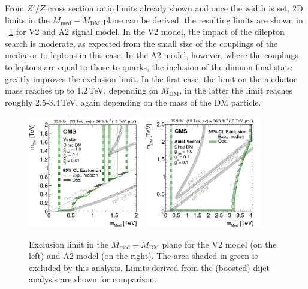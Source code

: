 From $Z'/Z$ cross section ratio limits already shown and once the width is set, 2D limits in the $M_{\mathrm{med}}-M_{\mathrm{DM}}$ plane can be derived: the resulting limits are shown in \figurename~\ref{fig:DMLimitV2} for V2 and A2 signal model. In the V2 model, the impact of the dilepton search is moderate, as expected from the small size of the couplings of the mediator to leptons in this case. In the A2 model, however, where the couplings to leptons are equal to those to quarks, the inclusion of the dimuon final state greatly improves the exclusion limit. In the first case, the limit on the mediator mass reaches up to 1.2\,TeV, depending on $M_{\mathrm{DM}}$, in the latter the limit reaches roughly 2.5-3.4\,TeV, again depending on the mass of the DM particle.
\begin{figure}[htbp]
\centering
\includegraphics[width=0.45\textwidth]{Images/Cap5/DM_vector} 
\includegraphics[width=0.45\textwidth]{Images/Cap5/DM_AxialVector} 
\caption{Exclusion limit in the $M_{\mathrm{med}}-M_{\mathrm{DM}}$ plane for the V2 model (on the left) and A2 model (on the right). The area shaded in green is excluded by this analysis. Limits derived from the (boosted) dijet analysis are shown for comparison. }
\label{fig:DMLimitV2}
\end{figure}